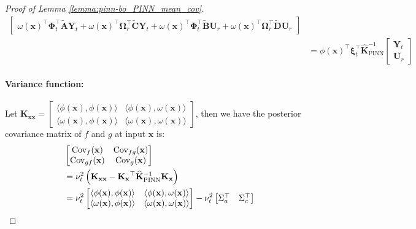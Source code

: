\begin{proof} [Proof of Lemma \ref{lemma:pinn-bo_PINN_mean_cov}]
\begin{align*}
\begin{bmatrix}
         \omega(\mathbf{x})^\top \boldsymbol{\Phi}_t^\top \widetilde{\mathbf{A}} \mathbf{Y}_t +  \omega(\mathbf{x})^\top \boldsymbol{\Omega}_r ^\top  \widetilde{\mathbf{C}} \mathbf{Y}_t  +\omega(\mathbf{x})^\top \boldsymbol{\Phi}_t^\top \widetilde{\mathbf{B}} \mathbf{U}_r  +  \omega(\mathbf{x})^\top \boldsymbol{\Omega}_r ^\top  \widetilde{\mathbf{D}} \mathbf{U}_r
    \end{bmatrix}
        \\
         &=\phi(\mathbf{x})^\top \boldsymbol{\xi}_t^\top \mathbf{\widehat{K}}_\mathrm{PINN}^{-1} \begin{bmatrix}
         \mathbf{Y}_t \\
         \mathbf{U}_r\end{bmatrix}
\end{align*}

\paragraph{Variance function:}
Let $\mathbf{K}_{\mathbf{xx}} = \begin{bmatrix}
\langle \phi(\mathbf{x}), \phi(\mathbf{x}) \rangle & \langle \phi(\mathbf{x}), \omega(\mathbf{x}) \rangle \\
\langle \omega(\mathbf{x}), \phi(\mathbf{x}) \rangle & \langle \omega(\mathbf{x}), \omega(\mathbf{x}) \rangle
\end{bmatrix}$, then we have the posterior covariance matrix of $f$ and $g$ at input $\mathbf{x}$ is:
\begin{align}
    &\begin{bmatrix}
    \mathrm{Cov}_f(\mathbf{x}) & \mathrm{Cov}_{fg}(\mathbf{x}) \\
    \mathrm{Cov}_{gf}(\mathbf{x}) & \mathrm{Cov}_g(\mathbf{x})
\end{bmatrix}  \\
&= \nu_t^2 \left(\mathbf{K}_{\mathbf{xx}} - \mathbf{K_x}^\top \mathbf{\widehat{K}}_\mathrm{PINN}^{-1} \mathbf{K_x} \right) \\
&= \nu_t^2   \begin{bmatrix}
\langle \phi(\mathbf{x}), \phi(\mathbf{x}) \rangle & \langle \phi(\mathbf{x}), \omega(\mathbf{x}) \rangle \notag \\
\langle \omega(\mathbf{x}), \phi(\mathbf{x}) \rangle & \langle \omega(\mathbf{x}), \omega(\mathbf{x}) \rangle
\end{bmatrix} - \nu_t^2
\begin{bmatrix}
        \Sigma_a^\top& \Sigma_c^\top \\

\end{bmatrix}
\end{align}
\end{proof}
